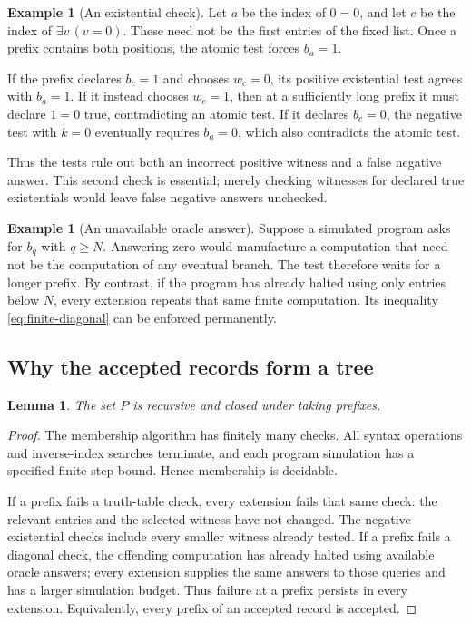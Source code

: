 \documentclass[11pt]{article}
\newtheorem{lemma}[theorem]{Lemma}
\theoremstyle{definition}
\newtheorem{example}[theorem]{Example}
\begin{document}
\begin{example}[An existential check]\label{ex:existential}
Let $a$ be the index of $0=0$, and let $c$ be the index of
$\exists v\,(v=0)$. These need not be the first entries of the fixed list.
Once a prefix contains both positions, the atomic test forces $b_a=1$.

If the prefix declares $b_c=1$ and chooses $w_c=0$, its positive existential
test agrees with $b_a=1$. If it instead chooses $w_c=1$, then at a sufficiently
long prefix it must declare $1=0$ true, contradicting an atomic test. If it
declares $b_c=0$, the negative test with $k=0$ eventually requires $b_a=0$,
which also contradicts the atomic test.

Thus the tests rule out both an incorrect positive witness and a false
negative answer. This second check is essential; merely checking witnesses
for declared true existentials would leave false negative answers unchecked.
\end{example}

\begin{example}[An unavailable oracle answer]
Suppose a simulated program asks for $b_q$ with $q\geq N$. Answering zero
would manufacture a computation that need not be the computation of any
eventual branch. The test therefore waits for a longer prefix. By contrast,
if the program has already halted using only entries below $N$, every
extension repeats that same finite computation. Its inequality
\eqref{eq:finite-diagonal} can be enforced permanently.
\end{example}

\subsection{Why the accepted records form a tree}

\begin{lemma}\label{lem:recursive-tree}
The set $P$ is recursive and closed under taking prefixes.
\end{lemma}

\begin{proof}
The membership algorithm has finitely many checks. All syntax operations
and inverse-index searches terminate, and each program simulation has a
specified finite step bound. Hence membership is decidable.

If a prefix fails a truth-table check, every extension fails that same
check: the relevant entries and the selected witness have not changed.
The negative existential checks include every smaller witness already
tested. If a prefix fails a diagonal check, the offending computation has
already halted using available oracle answers; every extension supplies
the same answers to those queries and has a larger simulation budget.
Thus failure at a prefix persists in every extension. Equivalently, every
prefix of an accepted record is accepted.
\end{proof}
\end{document}
